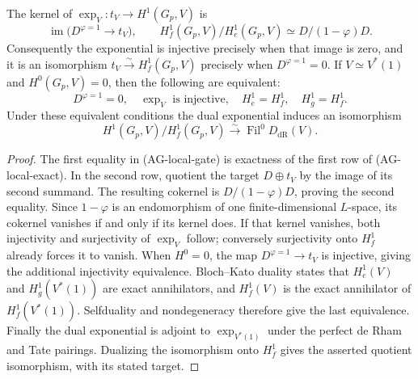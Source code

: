 \begin{proposition}
The kernel of $\exp_V:t_V\to H^1(G_p,V)$ is
\[
 \operatorname{im}\bigl(D^{\varphi=1}\longrightarrow t_V\bigr),
 \qquad
 H_f^1(G_p,V)/H_e^1(G_p,V)
       \simeq D/(1-\varphi)D.
\tag{AG-local-gate}
\]
Consequently the exponential is injective precisely when that
image is zero, and it is an isomorphism
$t_V\xrightarrow{\sim}H_f^1(G_p,V)$ precisely when
$D^{\varphi=1}=0$.
If $V\simeq V^*(1)$ and $H^0(G_p,V)=0$, then the following
are equivalent:
\[
 D^{\varphi=1}=0,\quad \exp_V\text{ is injective},\quad
 H_e^1=H_f^1,\quad H_g^1=H_f^1.
\]
Under these equivalent conditions the dual exponential induces
an isomorphism
\[
 H^1(G_p,V)/H_f^1(G_p,V)\xrightarrow{\sim}
            \operatorname{Fil}^0D_{\mathrm{dR}}(V).
\]
\end{proposition}
\begin{proof}
The first equality in (AG-local-gate) is exactness of the
first row of (AG-local-exact).  In the second row, quotient
the target $D\oplus t_V$ by the image of its second summand.
The resulting cokernel is $D/(1-\varphi)D$, proving the
second equality.  Since $1-\varphi$ is an endomorphism of
one finite-dimensional $L$-space, its cokernel vanishes if
and only if its kernel does.  If that kernel vanishes, both
injectivity and surjectivity of $\exp_V$ follow; conversely
surjectivity onto $H_f^1$ already forces it to vanish.
When $H^0=0$, the map $D^{\varphi=1}\to t_V$ is injective,
giving the additional injectivity equivalence.  Bloch--Kato
duality states that $H_e^1(V)$ and $H_g^1(V^*(1))$ are exact
annihilators, and $H_f^1(V)$ is the exact annihilator of
$H_f^1(V^*(1))$.  Selfduality and nondegeneracy therefore
give the last equivalence.  Finally the dual exponential is
adjoint to $\exp_{V^*(1)}$ under the perfect de Rham and
Tate pairings.  Dualizing the isomorphism onto $H_f^1$ gives
the asserted quotient isomorphism, with its stated target.
\end{proof}

